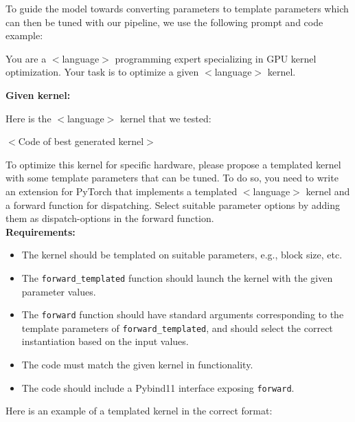 To guide the model towards converting parameters to template parameters which can then be tuned with our pipeline, we use the following prompt and code example: 

\begin{promptbox}
You are a $<$language$>$ programming expert specializing in GPU kernel optimization. Your task is to optimize a given $<$language$>$ kernel.

\textbf{Given kernel:}

Here is the $<$language$>$ kernel that we tested:

$<$Code of best generated kernel$>$

To optimize this kernel for specific hardware, please propose a templated kernel with some template parameters that can be tuned. To do so, you need to write an extension for PyTorch that implements a templated $<$language$>$ kernel and a forward function for dispatching. Select suitable parameter options by adding them as dispatch-options in the forward function.\\

\textbf{Requirements:}
\begin{itemize}
    \item The kernel should be templated on suitable parameters, e.g., block size, etc.
    \item The \texttt{forward\_templated} function should launch the kernel with the given parameter values.
    \item The \texttt{forward} function should have standard arguments corresponding to the template parameters of \texttt{forward\_templated}, and should select the correct instantiation based on the input values.
    \item The code must match the given kernel in functionality.
    \item The code should include a Pybind11 interface exposing \texttt{forward}.
\end{itemize}

Here is an example of a templated kernel in the correct format:
\end{promptbox}

